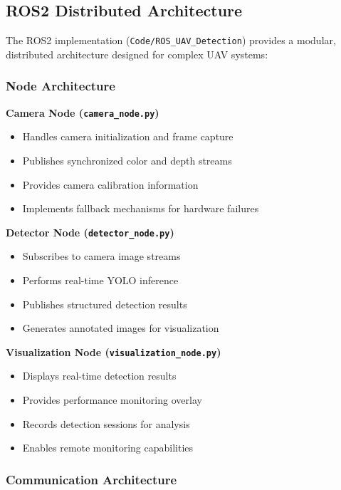 \documentclass[11pt,a4paper]{article}
\begin{document}
\subsection{ROS2 Distributed Architecture}

The ROS2 implementation (\texttt{Code/ROS\_UAV\_Detection}) provides a modular, distributed architecture designed for complex UAV systems:

\subsubsection{Node Architecture}

\textbf{Camera Node (\texttt{camera\_node.py})}
\begin{itemize}
    \item Handles camera initialization and frame capture
    \item Publishes synchronized color and depth streams
    \item Provides camera calibration information
    \item Implements fallback mechanisms for hardware failures
\end{itemize}


\textbf{Detector Node (\texttt{detector\_node.py})}
\begin{itemize}
    \item Subscribes to camera image streams
    \item Performs real-time YOLO inference
    \item Publishes structured detection results
    \item Generates annotated images for visualization
\end{itemize}

\textbf{Visualization Node (\texttt{visualization\_node.py})}
\begin{itemize}
    \item Displays real-time detection results
    \item Provides performance monitoring overlay
    \item Records detection sessions for analysis
    \item Enables remote monitoring capabilities
\end{itemize}

\subsubsection{Communication Architecture}
\end{document}
